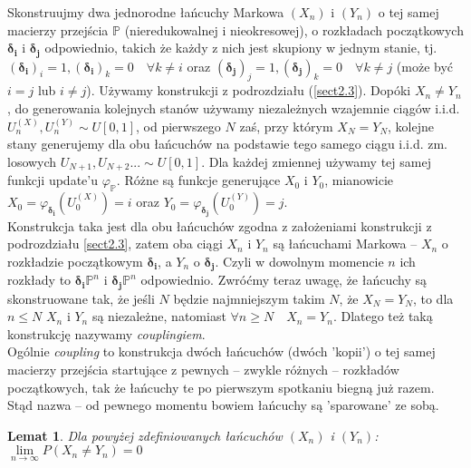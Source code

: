 \documentclass[a4paper]{article}
\theoremstyle{defn}
\theoremstyle{theorem}
\theoremstyle{lemma}
\newtheorem{lemma}[defn]{Lemat}
\theoremstyle{cor}
\theoremstyle{fact}
\begin{document}
Skonstruujmy dwa jednorodne łańcuchy Markowa $(X_n)$ i $(Y_n)$ o tej samej macierzy przejścia $\mathbb{P}$ (nieredukowalnej i nieokresowej), o rozkładach początkowych $\boldsymbol{\delta_i}$ i $\boldsymbol{\delta_j}$ odpowiednio, takich że każdy z nich jest skupiony w jednym stanie, tj. $(\boldsymbol{\delta_i})_i = 1, (\boldsymbol{\delta_i})_k = 0 \quad \forall k \neq i$ oraz $(\boldsymbol{\delta_j})_j = 1, (\boldsymbol{\delta_j})_k = 0 \quad \forall k \neq j$ (może być $i=j$ lub $i\neq j$). Używamy konstrukcji z podrozdziału (\ref{sect2.3}). Dopóki $X_n \neq Y_n$, do generowania kolejnych stanów używamy niezależnych wzajemnie ciągów i.i.d. $U_n^{(X)}, U_n^{(Y)} \sim U[0,1]$, od pierwszego $N$ zaś, przy którym $X_N = Y_N$, kolejne stany generujemy dla obu łańcuchów na podstawie tego samego ciągu i.i.d. zm. losowych $U_{N+1}, U_{N+2} ... \sim U[0,1]$. Dla każdej zmiennej używamy tej samej funkcji update'u $\varphi_{\mathbb{P}}$. Różne są funkcje generujące $X_0$ i $Y_0$, mianowicie $X_0 = \varphi_{\boldsymbol{\delta_i}}(U_0^{(X)}) = i$ oraz $Y_0 = \varphi_{\boldsymbol{\delta_j}}(U_0^{(Y)}) = j$.\\
Konstrukcja taka jest dla obu łańcuchów zgodna z założeniami konstrukcji z podrozdziału \ref{sect2.3}, zatem oba ciągi $X_n$ i $Y_n$ są łańcuchami Markowa – $X_n$ o rozkładzie początkowym $\boldsymbol{\delta_i}$, a $Y_n$ o $\boldsymbol{\delta_j}$. Czyli w dowolnym momencie $n$ ich rozkłady to $\boldsymbol{\delta_i}\mathbb{P}^n$ i $\boldsymbol{\delta_j}\mathbb{P}^n$ odpowiednio. Zwróćmy teraz uwagę, że łańcuchy są skonstruowane tak, że jeśli $N$ będzie najmniejszym takim $N$, że $X_N = Y_N$, to dla $n \leq N$ $X_n$ i $Y_n$ są niezależne, natomiast $\forall n \geq N \quad X_n = Y_n$. Dlatego też taką konstrukcję nazywamy \textit{couplingiem}.\\
Ogólnie \textit{coupling} to konstrukcja dwóch łańcuchów (dwóch 'kopii') o tej samej macierzy przejścia startujące z pewnych – zwykle różnych – rozkładów początkowych, tak że łańcuchy te po pierwszym spotkaniu biegną już razem. Stąd nazwa – od pewnego momentu bowiem łańcuchy są 'sparowane' ze sobą.
\\
\begin{lemma}\label{lemma2.4.5}
Dla powyżej zdefiniowanych łańcuchów $(X_n)$ i $(Y_n)$: $\lim\limits_{n \to \infty} P(X_n \neq Y_n) = 0$
\end{lemma}
\end{document}
